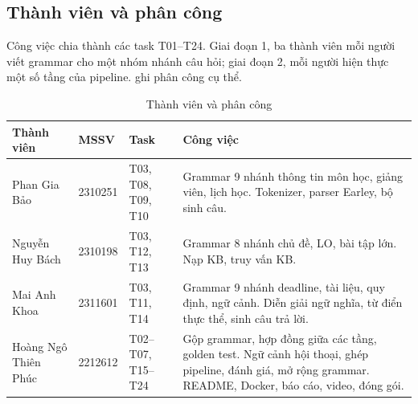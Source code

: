 \subsection{Thành viên và phân công}

Công việc chia thành các task T01--T24. Giai đoạn 1, ba
thành viên mỗi người viết grammar cho một nhóm nhánh câu hỏi; giai đoạn 2, mỗi người hiện
thực một số tầng của pipeline.  ghi phân công cụ thể.

\begin{table}[htbp]
  \centering
  \small
  \begin{tabularx}{\linewidth}{|P{3.2cm}|P{1.5cm}|P{1.9cm}|L|}
    \hline
    \textbf{Thành viên} & \textbf{MSSV} & \textbf{Task} & \textbf{Công việc} \\ \hline
    Phan Gia Bảo & 2310251 & T03, T08, T09, T10 & Grammar 9 nhánh thông tin môn học,
      giảng viên, lịch học. Tokenizer, parser Earley, bộ sinh câu. \\ \hline
    Nguyễn Huy Bách & 2310198 & T03, T12, T13 & Grammar 8 nhánh chủ đề, LO, bài tập lớn.
      Nạp KB, truy vấn KB. \\ \hline
    Mai Anh Khoa & 2311601 & T03, T11, T14 & Grammar 9 nhánh deadline, tài liệu, quy
      định, ngữ cảnh. Diễn giải ngữ nghĩa, từ điển thực thể, sinh câu trả lời. \\ \hline
    Hoàng Ngô Thiên Phúc & 2212612 & T02--T07, T15--T24 & Gộp grammar, hợp đồng giữa các
      tầng, golden test. Ngữ cảnh hội thoại, ghép pipeline, đánh giá, mở rộng grammar.
      README, Docker, báo cáo, video, đóng gói. \\ \hline
  \end{tabularx}
  \caption{Thành viên và phân công}
  \label{tab:members}
\end{table}
